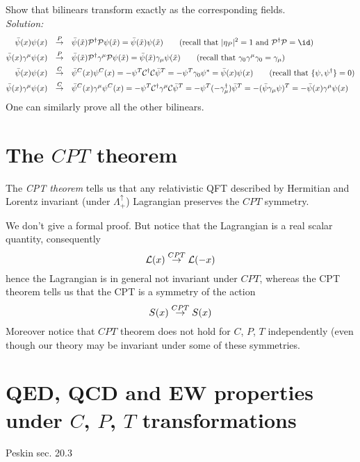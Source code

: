 \documentclass[TheoreticalPhy_ModB.tex]{subfiles}
\begin{document}
\begin{exercise}
Show that bilinears transform exactly as the corresponding fields.\\

\noindent
\textit{Solution:}
\[\begin{aligned}
\bar\psi(x)\psi(x)&&\sendP\quad&\bar\psi(\tilde x)\parity^\dagger\parity\psi(\tilde x)=\bar\psi(\tilde x)\psi(\tilde x)\qquad(\text{recall that }\vert\eta_P\vert^2=1\text{ and } \parity^\dagger\parity=\id)\\
\bar\psi(x)\gamma^\mu\psi(x)&&\sendP\quad&\bar\psi(\tilde x)\parity^\dagger\gamma^\mu\parity\psi(\tilde x)=\bar\psi(\tilde x)\gamma_\mu\psi(\tilde x)\qquad(\text{recall that }\gamma_0\gamma^\mu\gamma_0=\gamma_\mu)\\
\bar\psi(x)\psi(x)&&\sendC\quad&\bar\psi^C(x)\psi^C(x) = -\psi^T\charge^\dagger\charge\bar\psi^T=-\psi^T\gamma_0\psi^*=\bar\psi(x)\psi(x)\qquad(\text{recall that }\{\psi,\psi^\dagger\}=0)\\
\bar\psi(x)\gamma^\mu\psi(x)&&\sendC\quad&\bar\psi^C(x)\gamma^\mu\psi^C(x)=-\psi^T\charge^\dagger\gamma^\mu\charge\bar\psi^T=-\psi^T(-\gamma_\mu^\dagger)\bar\psi^T=-(\bar\psi\gamma_\mu\psi)^T=-\bar\psi(x)\gamma^\mu\psi(x)
\end{aligned}\]
\noindent
One can similarly prove all the other bilinears. 

\end{exercise}
 
\section{The $CPT$ theorem}

The \emph{CPT theorem} tells us that any relativistic QFT described by Hermitian and Lorentz invariant (under $\Lambda_+^\uparrow$) Lagrangian preserves the $CPT$ symmetry. 

We don't give a formal proof. But notice that the Lagrangian is a real scalar quantity, consequently
\[\mathcal L(x)\overset{CPT}{\to}\mathcal L(-x)\]
hence the Lagrangian is in general not invariant under $CPT$, whereas the CPT theorem tells us that the CPT is a symmetry of the action
\[S(x)\overset{CPT}{\to} S(x)\]
Moreover notice that $CPT$ theorem does not hold for $C$, $P$, $T$ independently (even though our theory may be invariant under some of these symmetries. 



\section{QED, QCD and EW properties under $C$, $P$, $T$ transformations}
\textsf{Peskin sec. 20.3}
\end{document}
